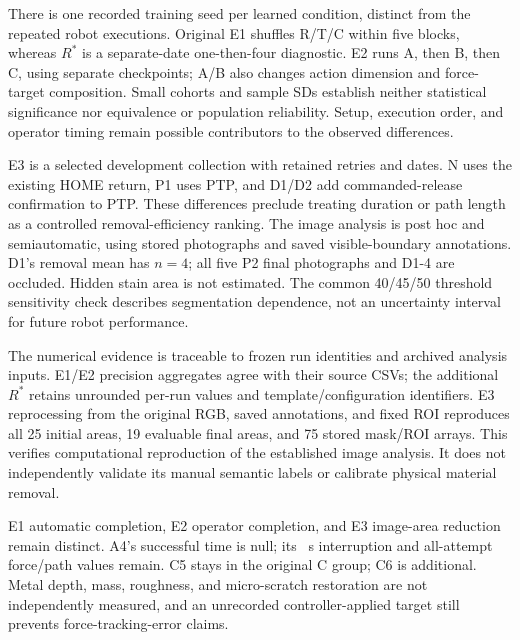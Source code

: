 There is one recorded training seed per learned condition, distinct from the repeated robot executions. Original E1 shuffles R/T/C within five blocks, whereas \(R^{*}\) is a separate-date one-then-four diagnostic. E2 runs A, then B, then C, using separate checkpoints; A/B also changes action dimension and force-target composition. Small cohorts and sample SDs establish neither statistical significance nor equivalence or population reliability. Setup, execution order, and operator timing remain possible contributors to the observed differences.

E3 is a selected development collection with retained retries and dates. N uses the existing HOME return, P1 uses PTP, and D1/D2 add commanded-release confirmation to PTP. These differences preclude treating duration or path length as a controlled removal-efficiency ranking. The image analysis is post hoc and semiautomatic, using stored photographs and saved visible-boundary annotations. D1's removal mean has \(n=4\); all five P2 final photographs and D1-4 are occluded. Hidden stain area is not estimated. The common 40/45/50 threshold sensitivity check describes segmentation dependence, not an uncertainty interval for future robot performance.

The numerical evidence is traceable to frozen run identities and archived analysis inputs. E1/E2 precision aggregates agree with their source CSVs; the additional \(R^{*}\) retains unrounded per-run values and template/configuration identifiers. E3 reprocessing from the original RGB, saved annotations, and fixed ROI reproduces all 25 initial areas, 19 evaluable final areas, and 75 stored mask/ROI arrays. This verifies computational reproduction of the established image analysis. It does not independently validate its manual semantic labels or calibrate physical material removal.

E1 automatic completion, E2 operator completion, and E3 image-area reduction remain distinct. A4's successful time is null; its \AfourInterval~s interruption and all-attempt force/path values remain. C5 stays in the original C group; C6 is additional. Metal depth, mass, roughness, and micro-scratch restoration are not independently measured, and an unrecorded controller-applied target still prevents force-tracking-error claims.
